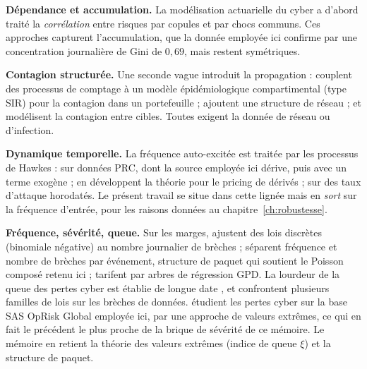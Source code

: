 \textbf{Dépendance et accumulation.} La modélisation actuarielle du cyber a d'abord traité la
\emph{corrélation} entre risques par copules \citep{BohmeKataria2006, HerathHerath2011}
et par chocs communs. Ces approches capturent l'accumulation, que la donnée employée ici
confirme par une concentration journalière de Gini de $0{,}69$, mais restent symétriques.

\textbf{Contagion structurée.} Une seconde vague introduit la propagation : \citet{HillairetLopez2021}
couplent des processus de comptage à un modèle épidémiologique compartimental (type
SIR) pour la contagion dans un portefeuille ; \citet{HillairetLopezDOultremontSpoorenberg2022}
ajoutent une structure de réseau ; \citet{XuHua2017} et \citet{Baldwin2017}
modélisent la contagion entre cibles. Toutes exigent la donnée de réseau ou d'infection.

\textbf{Dynamique temporelle.} La fréquence auto-excitée est traitée par les processus de
Hawkes : \citet{BessyRolandBoumezouedHillairet2021} sur données PRC, dont la source
employée ici dérive, puis \citet{BoumezouedCherkaouiHillairet2023} avec un terme exogène ;
\citet{HillairetReveillacRosenbaum2021} en développent la théorie pour le pricing de
dérivés ; \citet{Peng2016} sur des taux d'attaque horodatés. Le présent travail se situe dans cette
lignée mais en \emph{sort} sur la fréquence d'entrée, pour les raisons données au
chapitre~\ref{ch:robustesse}.

\textbf{Fréquence, sévérité, queue.} Sur les marges, \citet{Edwards2016} ajustent des lois
discrètes (binomiale négative) au nombre journalier de brèches ; \citet{LuZhangZhu2024}
séparent fréquence et nombre de brèches par événement, structure de paquet qui soutient le
Poisson composé retenu ici ; \citet{FarkasLopezThomas2021} tarifent par arbres de régression
GPD. La lourdeur de la queue des pertes cyber est établie de longue date
\citep{MaillartSornette2010, wheatley2016}, et \citet{elingloperfido2017} confrontent plusieurs
familles de lois sur les brèches de données. \citet{elingwirfs2019} étudient les pertes cyber sur
la base SAS OpRisk Global employée ici, par une approche de valeurs extrêmes, ce qui en fait le
précédent le plus proche de la brique de sévérité de ce mémoire. Le mémoire en retient la théorie
des valeurs extrêmes (indice de queue $\xi$) et la structure de paquet.


